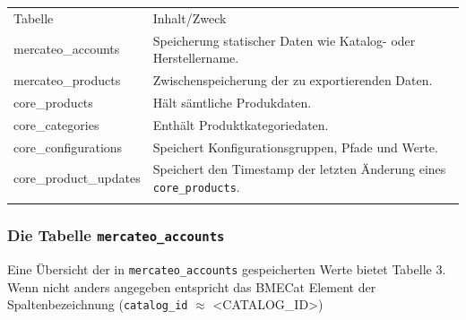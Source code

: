 	\begin{table}[!htbp]
		\begin{tabularx}{\textwidth}{p{3.8cm} X  }
			\rowcolor[HTML]{EFEFEF} 
			Tabelle & Inhalt/Zweck  \\ \cline{1-2} \addlinespace[7pt]
			mercateo\_accounts & Speicherung statischer Daten wie Katalog- oder Herstellername. \\
			mercateo\_products & Zwischenspeicherung der zu exportierenden Daten.  \\
			core\_products & Hält sämtliche Produkdaten. \\
			core\_categories & Enthält Produktkategoriedaten. \\
			core\_configurations & Speichert Konfigurationsgruppen, Pfade und Werte. \\ 
			core\_product\_updates & Speichert den Timestamp der letzten Änderung eines \texttt{core\_products}. \\ \addlinespace[7pt] \cline{1-2} 	
	
		\end{tabularx}%
	\end{table}
		
	\subsubsection{Die Tabelle \texttt{mercateo\_accounts}}
	
	Eine Übersicht der in \texttt{mercateo\_accounts} gespeicherten Werte bietet Tabelle 3. Wenn nicht anders angegeben entspricht das BMECat Element der Spaltenbezeichnung (\texttt{catalog\_id} $\approx$ \textless CATALOG\_ID\textgreater )

